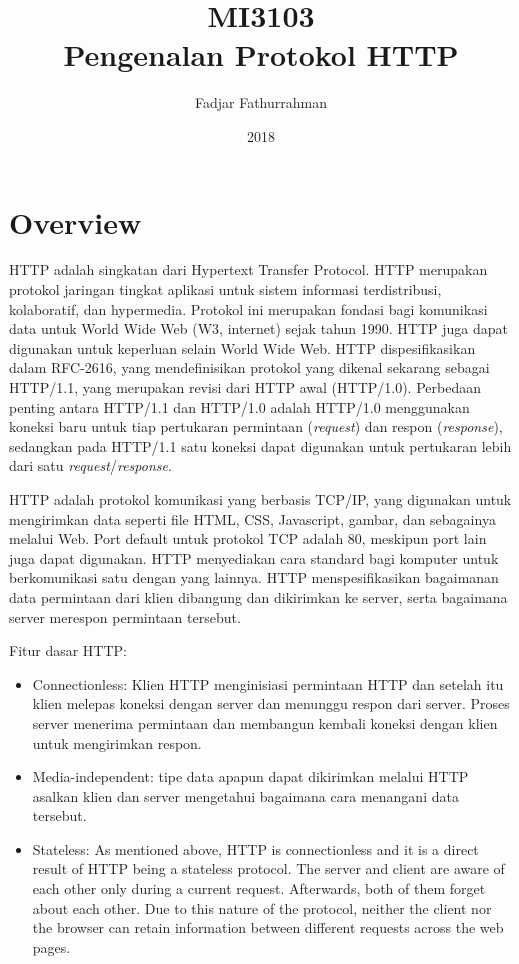 \documentclass[a4paper,11pt,bahasa]{extarticle}
\title{
MI3103 \\
Pengenalan Protokol HTTP}
\author{Fadjar Fathurrahman}
\date{2018}
\begin{document}
\maketitle

\tableofcontents

\section{Overview}

HTTP adalah singkatan dari Hypertext Transfer Protocol. HTTP merupakan protokol
jaringan tingkat aplikasi untuk sistem informasi terdistribusi, kolaboratif,
dan hypermedia. Protokol ini merupakan fondasi bagi komunikasi data untuk
World Wide Web (W3, internet) sejak tahun 1990. HTTP juga
dapat digunakan untuk keperluan selain World Wide Web.
HTTP dispesifikasikan dalam RFC-2616, yang mendefinisikan protokol yang
dikenal sekarang sebagai HTTP/1.1, yang merupakan revisi dari HTTP awal
(HTTP/1.0). Perbedaan penting antara HTTP/1.1 dan HTTP/1.0 adalah HTTP/1.0
menggunakan koneksi baru untuk tiap pertukaran permintaan (\textit{request})
dan respon (\textit{response}), sedangkan pada HTTP/1.1 satu koneksi
dapat digunakan untuk pertukaran lebih dari satu
\textit{request}/\textit{response}.

HTTP adalah protokol komunikasi yang berbasis TCP/IP, yang digunakan
untuk mengirimkan data seperti file HTML, CSS, Javascript, gambar, dan
sebagainya melalui Web.
Port default untuk protokol TCP adalah 80, meskipun port lain juga dapat
digunakan.
HTTP menyediakan cara standard bagi komputer untuk berkomunikasi
satu dengan yang lainnya.
HTTP menspesifikasikan bagaimanan data permintaan
dari klien dibangung dan dikirimkan ke server, serta bagaimana
server merespon permintaan tersebut.

Fitur dasar HTTP:
\begin{itemize}
\item Connectionless: Klien HTTP menginisiasi permintaan HTTP dan setelah itu klien
melepas koneksi dengan server dan menunggu respon dari server. Proses server
menerima permintaan dan membangun kembali koneksi dengan klien untuk
mengirimkan respon.
\item Media-independent: tipe data apapun dapat dikirimkan melalui HTTP asalkan
klien dan server mengetahui bagaimana cara menangani data tersebut.
\item Stateless: As mentioned above, HTTP is connectionless and it
is a direct result of HTTP being a stateless protocol.
The server and client are aware of each other only during a
current request. Afterwards, both of them forget about each other.
Due to this nature of the protocol, neither the client nor the
browser can retain information between different requests across the web pages.
\end{itemize}
\end{document}
